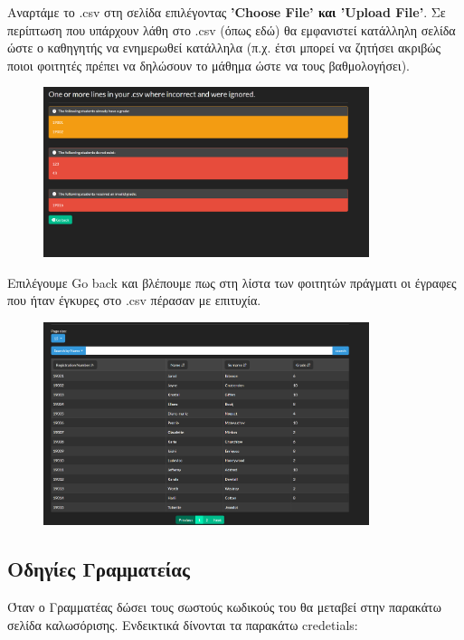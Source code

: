 \documentclass[12pt]{article}
\begin{document}
	Αναρτάμε το .csv στη σελίδα επιλέγοντας \textbf{'Choose File' και 'Upload File'}. Σε περίπτωση που υπάρχουν λάθη στο .csv (όπως εδώ) θα εμφανιστεί κατάλληλη σελίδα ώστε ο καθηγητής να ενημερωθεί κατάλληλα (π.χ. έτσι μπορεί να ζητήσει ακριβώς ποιοι φοιτητές πρέπει να δηλώσουν το μάθημα ώστε να τους βαθμολογήσει).
	
	\begin{figure}[H]
		\centering
		\includegraphics[width=0.85\textwidth]{reported.png}
		\caption{}
		\label{fig:emptyView}
	\end{figure}

	Επιλέγουμε Go back και βλέπουμε πως στη λίστα των φοιτητών πράγματι οι έγραφες που ήταν έγκυρες στο .csv πέρασαν με επιτυχία.

	\begin{figure}[H]
		\centering
		\includegraphics[width=0.85\textwidth]{cool.png}
		\caption{}
		\label{fig:emptyView}
	\end{figure}
	
	\newpage
	\subsection{Οδηγίες Γραμματείας}
	
		Όταν ο Γραμματέας δώσει τους σωστούς κωδικούς του θα μεταβεί στην παρακάτω σελίδα καλωσόρισης. Ενδεικτικά δίνονται τα παρακάτω credetials:
	
\end{document}
